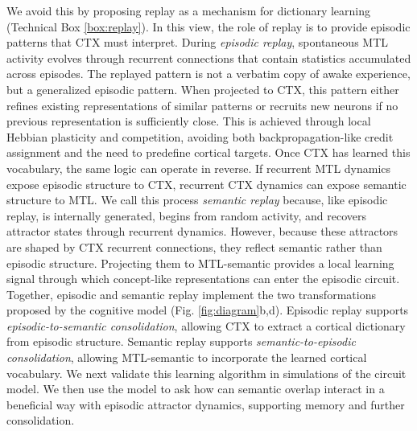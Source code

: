 \documentclass{article}
\begin{document}
\newline\newline
We avoid this by proposing replay as a mechanism for dictionary learning (Technical Box \ref{box:replay}). In this view, the role of replay is to provide episodic patterns that CTX must interpret.
During \textit{episodic replay}, spontaneous MTL activity evolves through recurrent connections that contain statistics accumulated across episodes. The replayed pattern is not a verbatim copy of awake experience, but a generalized episodic pattern. When projected to CTX, this pattern either refines existing representations of similar patterns or recruits new neurons if no previous representation is sufficiently close. This is achieved through local Hebbian plasticity and competition, avoiding both backpropagation-like credit assignment and the need to predefine cortical targets.
\newline\newline
Once CTX has learned this vocabulary, the same logic can operate in reverse. If recurrent MTL dynamics expose episodic structure to CTX, recurrent CTX dynamics can expose semantic structure to MTL. We call this process \textit{semantic replay} because, like episodic replay, is internally generated, begins from random activity, and recovers attractor states through recurrent dynamics. However, because these attractors are shaped by CTX recurrent connections, they reflect semantic rather than episodic structure. Projecting them to MTL-semantic provides a local learning signal through which concept-like representations can enter the episodic circuit.
\newline\newline
Together, episodic and semantic replay implement the two transformations proposed by the cognitive model (Fig. \ref{fig:diagram}b,d). Episodic replay supports \textit{episodic-to-semantic consolidation}, allowing CTX to extract a cortical dictionary from episodic structure. Semantic replay supports \textit{semantic-to-episodic consolidation}, allowing MTL-semantic to incorporate the learned cortical vocabulary. We next validate this learning algorithm in simulations of the circuit model. We then use the model to ask how can semantic overlap interact in a beneficial way with episodic attractor dynamics, supporting memory and further consolidation.
\end{document}
